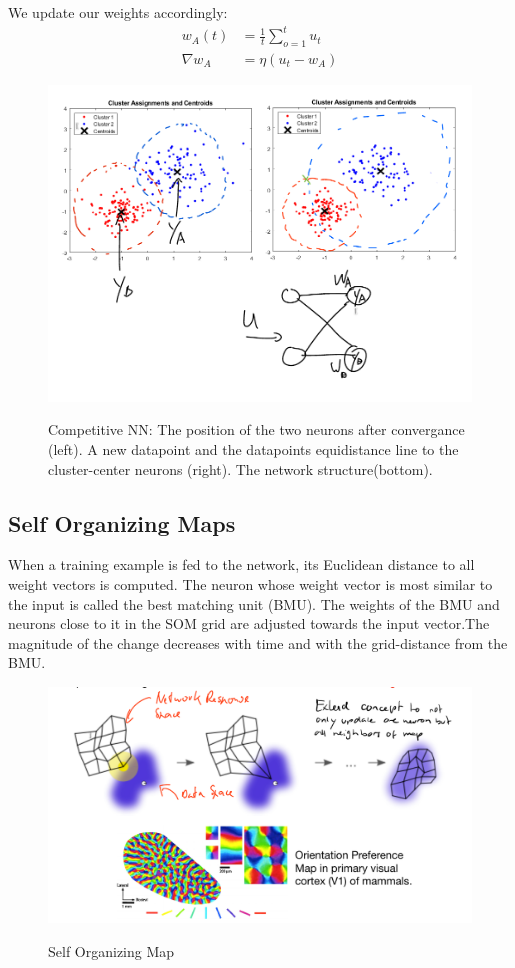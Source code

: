\documentclass[main]{subfiles}
\begin{document}
We update our weights accordingly:
\begin{align} 
    w_A(t) &= \frac{1}{t}\sum_{o=1}^t u_t \\
    \nabla w_A &= \eta (u_t - w_A)
\end{align}

\begin{figure}[H]
	\centering
	\includegraphics[width=0.8\linewidth]{07_UnsupervisedAndSelfsupervisedLearning/figures/competitive-nn.png}
	\label{fig:competitive-nn}
	\caption{Competitive NN: The position of the two neurons after convergance (left). A new datapoint and the datapoints equidistance line to the cluster-center neurons (right). The network structure(bottom).}
\end{figure}


\subsection{Self Organizing Maps}
 When a training example is fed to the network, its Euclidean distance to all weight vectors is computed. The neuron whose weight vector is most similar to the input is called the best matching unit (BMU). The weights of the BMU and neurons close to it in the SOM grid are adjusted towards the input vector.The magnitude of the change decreases with time and with the grid-distance from the BMU.

\begin{figure}[H]
	\centering
	\includegraphics[width=0.9\linewidth]{07_UnsupervisedAndSelfsupervisedLearning/figures/competitive-som.png}
	\label{fig:competitive-som}
	\caption{Self Organizing Map}
\end{figure}
\end{document}
